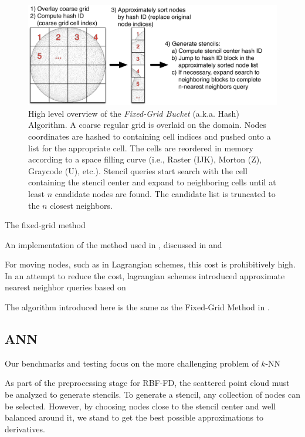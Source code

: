 \documentclass{report}
\begin{document}
\begin{figure}
\centering
\includegraphics[width=1.0\textwidth]{../figures/chapter2/hashing_example/LSH_Concept.png}
\caption{High level overview of the \emph{Fixed-Grid Bucket} (a.k.a. Hash) Algorithm. A coarse regular grid is overlaid on the domain. Nodes coordinates are hashed to containing cell indices and pushed onto a list for the appropriate cell. The cells are reordered in memory according to a space filling curve (i.e., Raster (IJK), Morton (Z), Graycode (U), etc.). Stencil queries start search with the cell containing the stencil center and expand to neighboring cells until at least $n$ candidate nodes are found. The candidate list is truncated to the $n$ closest neighbors. }
\label{fig:hash_highlevel}
\end{figure} 


The fixed-grid method 


An implementation of the method used in \cite{Wendland2002}, discussed in \cite{WendlandBook} and 


For moving nodes, such as in Lagrangian schemes, this cost is prohibitively high. In an attempt to reduce the cost, lagrangian schemes introduced approximate nearest neighbor queries based on 



The algorithm introduced here is the same as the Fixed-Grid Method in \cite{WendlandBook}.     

\subsection{ANN}
Our benchmarks and testing focus on the more challenging problem of $k$-NN

As part of the preprocessing stage for RBF-FD, the scattered point cloud must
be analyzed to generate stencils. To generate a stencil, any collection of
nodes can be selected. However, by choosing nodes close to the stencil center
and well balanced around it, we stand to get the best possible approximations
to derivatives. 
\end{document}
